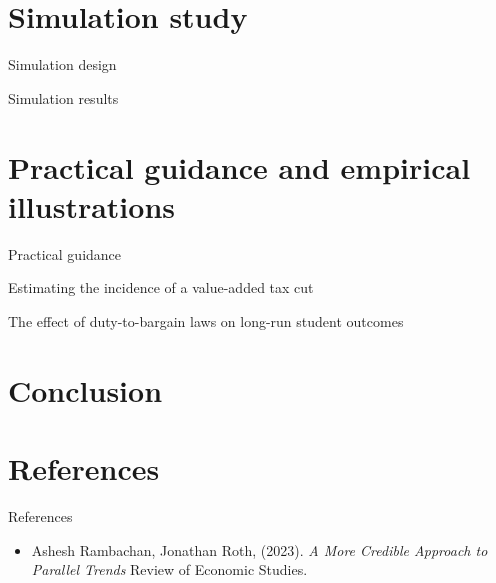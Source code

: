 \documentclass[xcolor=svgnames,aspectratio=169]{beamer}
\begin{document}
\section{Simulation study}

\begin{frame}{Simulation design}
\begin{itemize}
\end{itemize}
\end{frame}

\begin{frame}{Simulation results}
\begin{itemize}
\end{itemize}
\end{frame}

\section{Practical guidance and empirical illustrations}

\begin{frame}{Practical guidance}
\begin{itemize}
\end{itemize}
\end{frame}

\begin{frame}{Estimating the incidence of a value-added tax cut}
\begin{itemize}
\end{itemize}
\end{frame}

\begin{frame}{The effect of duty-to-bargain laws on long-run student outcomes}
\begin{itemize}
\end{itemize}
\end{frame}

\section{Conclusion}

\section{References}

\begin{frame}{References}
  \begin{itemize}
    \item Ashesh Rambachan, Jonathan Roth, (2023). 
          \textit{A More Credible Approach to Parallel Trends} 
          Review of Economic Studies.
  \end{itemize}
\end{frame}
\end{document}
